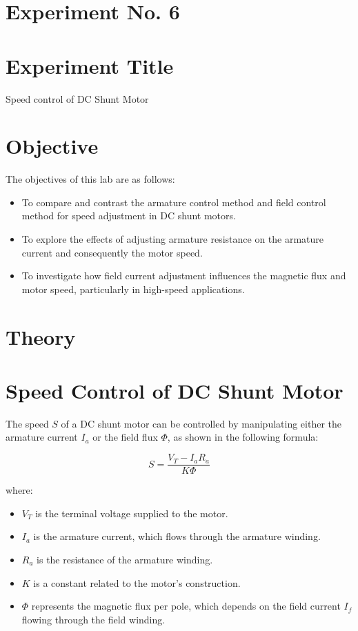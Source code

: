 \documentclass[a4paper,12pt]{article}
\begin{document}
	\section{Experiment No. 6}
	
	\section{Experiment Title }
Speed control of DC Shunt Motor
	\section{Objective}
	
	The objectives of this lab are as follows:
	\begin{itemize}
	\item To compare and contrast the armature control method and field control method for speed adjustment in DC shunt motors.
	\item To explore the effects of adjusting armature resistance on the armature current and consequently the motor speed.
	\item To investigate how field current adjustment influences the magnetic flux and motor speed, particularly in high-speed applications.
	\end{itemize}
	
	\section{Theory}
	
	\section*{Speed Control of DC Shunt Motor}
	
	The speed \( S \) of a DC shunt motor can be controlled by manipulating either the armature current \( I_a \) or the field flux \( \Phi \), as shown in the following formula:
	
	\[
	S = \frac{V_T - I_a R_a}{K \Phi}
	\]
	
	where:
	\begin{itemize}
		\item \( V_T \) is the terminal voltage supplied to the motor.
		\item \( I_a \) is the armature current, which flows through the armature winding.
		\item \( R_a \) is the resistance of the armature winding.
		\item \( K \) is a constant related to the motor’s construction.
		\item \( \Phi \) represents the magnetic flux per pole, which depends on the field current \( I_f \) flowing through the field winding.
	\end{itemize}
	
\end{document}
